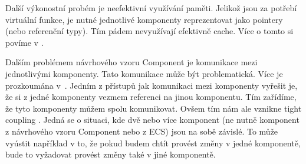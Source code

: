 Další výkonostní probém je neefektivní využívání paměti. Jelikož jsou za potřebí virtuální funkce, je nutné jednotlivé komponenty reprezentovat jako pointery (nebo referenční typy). Tím pádem nevyužívají efektivně cache. Více o tomto si povíme v .

Dalším problémem návrhového vzoru Component je komunikace mezi jednotlivými komponenty. Tato komunikace může být problematická. Více je prozkoumána v~\citet{nystrom2014game}. Jedním z přístupů jak komunikaci mezi komponenty vyřešit je, že si z jedné komponenty vezmem referenci na jinou komponentu. Tím zařídíme, že tyto komponenty můžem spolu komunikovat. Ovšem tím nám ale vznikne tight coupling . Jedná se o situaci, kde dvě nebo více komponent (ne nutně komponent z návrhového vzoru Component nebo z ECS) jsou na sobě závislé. To může vyústit například v to, že pokud budem chtít provést změny v jedné komponentě, bude to vyžadovat provést změny také v jiné komponentě.